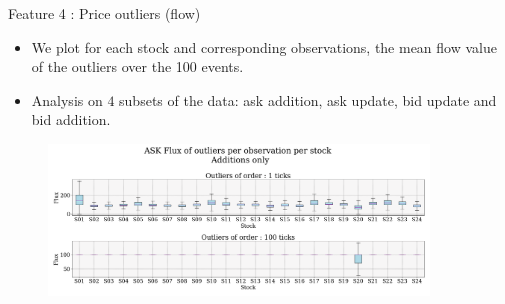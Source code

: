 \documentclass{beamer}
\begin{document}
\begin{frame}{Feature 4 : Price outliers (flow)}
    \begin{itemize}
        \item We plot for each stock and corresponding observations, the mean flow value of the outliers over the 100 events.
        \item Analysis on $4$ subsets of the data: ask addition, ask update, bid update and bid addition.
    \end{itemize}
    \begin{figure}[H]
        \centering
        \includegraphics[width=0.9\textwidth]{figures/boxplot_flux_outliers_ASK.png}
    \end{figure}
\end{frame}
\end{document}
